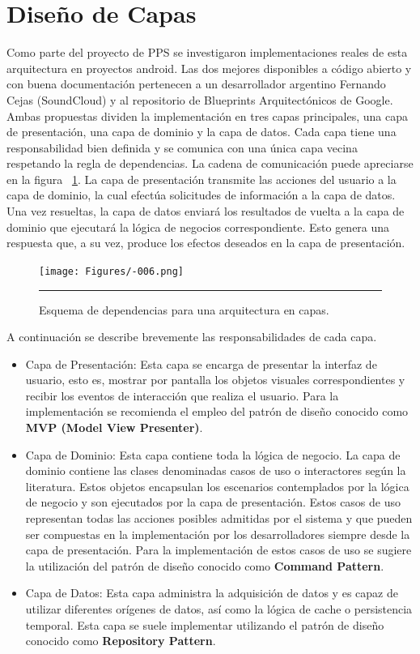 \section{Diseño de Capas}
Como parte del proyecto de PPS se investigaron implementaciones reales de esta arquitectura en proyectos android.
Las dos mejores disponibles a código abierto y con buena documentación pertenecen a un desarrollador argentino Fernando Cejas \cite{clean_cejas} (SoundCloud) y al repositorio de Blueprints Arquitectónicos de Google\cite{clean_android_blueprints}.\\
Ambas propuestas dividen la implementación en tres capas principales, una capa de presentación, una capa de dominio y la capa de datos.
Cada capa tiene una responsabilidad bien definida y se comunica con una única capa vecina respetando la regla de dependencias.
La cadena de comunicación puede apreciarse en la figura ~\ref{fig:Diagrama_clasico2}. La capa de presentación transmite las acciones del usuario a la capa de dominio, la cual efectúa solicitudes de información a la capa de datos. Una vez resueltas, la capa de datos enviará los resultados de vuelta a la capa de dominio que ejecutará la lógica de negocios correspondiente. Esto genera una respuesta que, a su vez, produce los efectos deseados en la capa de presentación.\\
\begin{figure}[htbp]
	\centering
	\texttt{[image: Figures/-006.png]}
	\rule{35em}{1pt}
	\caption[Dependencia de Módulos]{Esquema de dependencias para una arquitectura en capas.}
	\label{fig:Diagrama_clasico2}
\end{figure}
A continuación se describe brevemente las responsabilidades de cada capa.


\begin{itemize}
	\item Capa de Presentación: Esta capa se encarga de presentar la interfaz de usuario, esto es, mostrar por pantalla los objetos visuales correspondientes y recibir los eventos de interacción que realiza el usuario. Para la implementación se recomienda el empleo del patrón de diseño conocido como \textbf{MVP (Model View Presenter)}. 
	\item Capa de Dominio: Esta capa contiene toda la lógica de negocio. La capa de dominio contiene las clases denominadas casos de uso o interactores según la literatura. Estos objetos encapsulan los escenarios contemplados por la lógica de negocio y son ejecutados por la capa de presentación. Estos casos de uso representan todas las acciones posibles admitidas por el sistema y que pueden ser compuestas en la implementación por los desarrolladores siempre desde la capa de presentación. Para la implementación de estos casos de uso se sugiere la utilización del patrón de diseño conocido como \textbf{Command Pattern}.
	\item Capa de Datos: Esta capa administra la adquisición de datos y es capaz de utilizar diferentes orígenes de datos, así como la lógica de cache o persistencia temporal. Esta capa se suele implementar utilizando el patrón de diseño conocido como \textbf{Repository Pattern}.  
\end{itemize}
